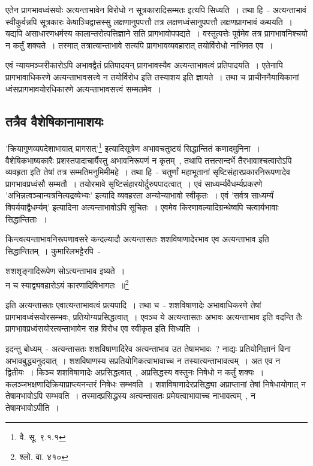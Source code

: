 		एतेन प्रागभावध्वंसयोः अत्यन्ताभावेन विरोधो न सूत्रकारादिसम्मतः इत्यपि सिध्यति~। तथा हि~- अत्यन्ताभावं स्वीकुर्वन्नपि सूत्रकारः केषाञ्चिद्वासस्सु लक्षणानुपपत्तौ तत्र लक्षणध्वंसानुपपत्तौ लक्षणप्रागभावं कथयति~। यद्यपि असाधारणधर्मस्य कालान्तरोत्पत्तिज्ञाने सति प्रागभावोपपद्यते~। वस्तूत्पत्तेः पूर्वमेव तत्र प्रागभावनिश्चयो न कर्तुं शक्यते~। तस्मात् तत्रात्यान्ताभावे सत्यपि प्रागभावव्यवहारात् तयोर्विरोधो नाभिमत एव~।

		एवं न्यायमञ्जरीकारोऽपि अभावद्वैतं प्रतिपादयन् प्रागभावस्यैव अत्यन्ताभावत्वं प्रतिपादयति~। एतेनापि प्रागभावाधिकरणे अत्यन्ताभावसत्त्वे न तयोर्विरोध इति तस्याशय इति ज्ञायते~। तथा च प्राचीननैयायिकानां ध्वंसप्रागभावयोरधिकारणे अत्यन्ताभावसत्त्वं सम्मतमेव~।

		\subsection{तत्रैव वैशेषिकानामाशयः}

		'क्रियागुणव्यपदेशाभावात् प्रागसत्'\footnote{वै. सू. ९.१.१} इत्यादिसूत्रेण अभावचतुष्टयं सिद्धान्तितं कणादमुनिना~। वैशेषिकभाष्यकारैः प्रशस्तपादाचार्यैस्तु अभावनिरूपणं न कृतम्~, तथापि तत्तत्सन्दर्भे तैरभावाश्चत्वारोऽपि व्यवहृता इति तेषां तत्र सम्मतिमनुमिमीमहे~। तथा हि~- चतुर्णां महाभूतानां सृष्टिसंहारप्रकारनिरूपणादेव प्रागभावप्रध्वंसौ सम्मतौ~। तयोरभावे सृष्टिसंहारयोर्दुरुपपादत्वात्~। एवं साध्यर्म्यवैधर्म्यप्रकरणे 'अभिन्नत्वञ्चान्यत्रनित्यद्रव्येभ्यः' इत्यादि व्यवहरता अन्योन्याभावो स्वीकृतः~। एवं 'सर्वत्र साध्यर्म्यं विपर्ययाद्वैधर्म्यम्' इत्यादिना अत्यन्ताभावोऽपि सूचितः~। एवमेव किरणावल्यादिग्रन्थेष्वपि चत्वार्यभावाः सिद्धान्तिताः~।

		किन्त्वत्यन्ताभावनिरूपणावसरे कन्दल्यादौ अत्यन्तासतः शशविषाणादेरभाव एव अत्यन्ताभाव इति सिद्धान्तितम्~। कुमारिलभट्टैरपि~-\\ \begin{center}शशशृङ्गादिरूपेण सोऽत्यन्ताभाव इष्यते~।\\ न च स्याद्व्यवहारोऽयं कारणादिविभागतः~॥\footnote{श्लो. वा. ४१०}\\\end{center} इति अत्यन्तासतः एवात्यन्ताभावत्वं प्रत्यपादि~। तथा च~- शशविषाणादेः अभावाधिकरणे तेषां प्रागभावध्वंसयोरसम्भवः, प्रतियोग्यप्रसिद्धत्वात्~। एवञ्च ये अत्यन्तासतः अभावः अत्यन्ताभाव इति वदन्ति तैः प्रागभावप्रध्वंसयोरत्यन्ताभावेन सह विरोध एव स्वीकृत इति सिध्यति~।

		इदन्तु बोध्यम्~- अत्यन्तासतः शशविषाणादिरेव अत्यन्ताभाव उत तेषामभावः~? नाद्यः प्रतियोगिज्ञानं विना अभावबुद्ध्यनुदयात्~। शशविषाणस्य सप्रतियोगिकत्वाभावाच्च न तस्यात्यन्ताभावत्वम्~। अत एव न द्वितीयः~। किञ्च शशविषाणादेः अप्रसिद्धत्वात्~, अप्रसिद्धस्य वस्तुनः निषेधो न कर्तुं शक्यः~। कलञ्जभक्षणादिक्रियाप्राप्त्यनन्तरं निषेधः सम्भवति~। शशविषाणादेरप्रसिद्ध्या अप्राप्तानां तेषां निषेधायोगात् न तेषामभावोऽपि सम्भवति~। तस्मादप्रसिद्धस्य अत्यन्तासतः प्रमेयत्वाभावाच्च नाभावत्वम्~, न तेषामभावोऽपीति~।

